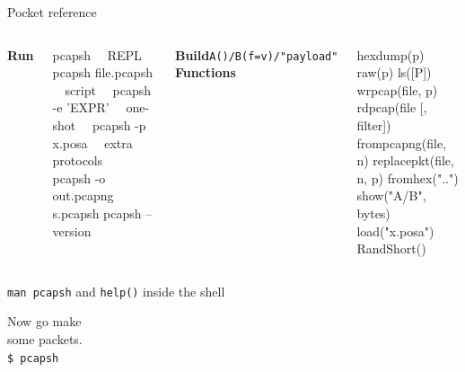 \documentclass[aspectratio=169,11pt]{beamer}
\begin{document}
\begin{frame}[fragile]{Pocket reference}
\small
\begin{columns}[T]
\textbf{Run}
\begin{term}
pcapsh                    ~~REPL~~
pcapsh file.pcapsh        ~~script~~
pcapsh -e 'EXPR'          ~~one-shot~~
pcapsh -p x.posa          ~~extra protocols~~
pcapsh -o out.pcapng s.pcapsh
pcapsh --version
\end{term}
\textbf{Build}\quad \texttt{A()/B(f=v)/"payload"}
\textbf{Functions}
\begin{term}
hexdump(p)  raw(p)  ls([P])
wrpcap(file, p)
rdpcap(file [, filter])
frompcapng(file, n)
replacepkt(file, n, p)
fromhex("..")  show("A/B", bytes)
load("x.posa")  RandShort()
\end{term}
\end{columns}
\bigskip
\centering
\Large\texttt{man pcapsh} \quad \normalsize and \texttt{help()} inside the shell
\end{frame}

{
\begin{frame}[standout]
  \Huge Now go make\\[2mm] some packets.\\[6mm]
  \Large \texttt{\$ pcapsh}
\end{frame}
}
\end{document}
